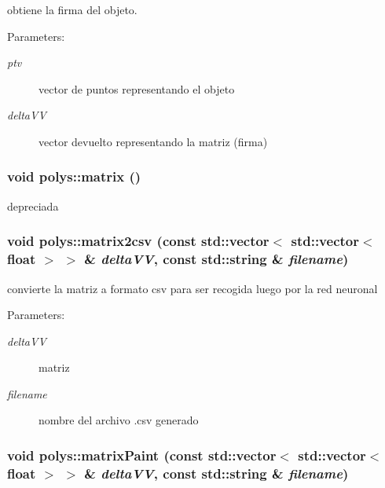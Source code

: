 obtiene la firma del objeto.

\begin{Desc}
\item[Parameters:]
\begin{description}
\item[{\em ptv}]vector de puntos representando el objeto \item[{\em deltaVV}]vector devuelto representando la matriz (firma) \end{description}
\end{Desc}
\hypertarget{classpolys_a858294eddc4fe0f9a6e1292e9687249}{
\subsubsection[{matrix}]{\setlength{\rightskip}{0pt plus 5cm}void polys::matrix ()}}
\label{classpolys_a858294eddc4fe0f9a6e1292e9687249}


depreciada \hypertarget{classpolys_87d1385def6b1b43d713ac19403d5c08}{
\subsubsection[{matrix2csv}]{\setlength{\rightskip}{0pt plus 5cm}void polys::matrix2csv (const std::vector$<$ std::vector$<$ float $>$ $>$ \& {\em deltaVV}, \/  const std::string \& {\em filename})}}
\label{classpolys_87d1385def6b1b43d713ac19403d5c08}


convierte la matriz a formato csv para ser recogida luego por la red neuronal

\begin{Desc}
\item[Parameters:]
\begin{description}
\item[{\em deltaVV}]matriz \item[{\em filename}]nombre del archivo .csv generado \end{description}
\end{Desc}
\hypertarget{classpolys_e0bab6a2070d9c92290bdc84e02d0ebc}{
\subsubsection[{matrixPaint}]{\setlength{\rightskip}{0pt plus 5cm}void polys::matrixPaint (const std::vector$<$ std::vector$<$ float $>$ $>$ \& {\em deltaVV}, \/  const std::string \& {\em filename})}}
\label{classpolys_e0bab6a2070d9c92290bdc84e02d0ebc}


